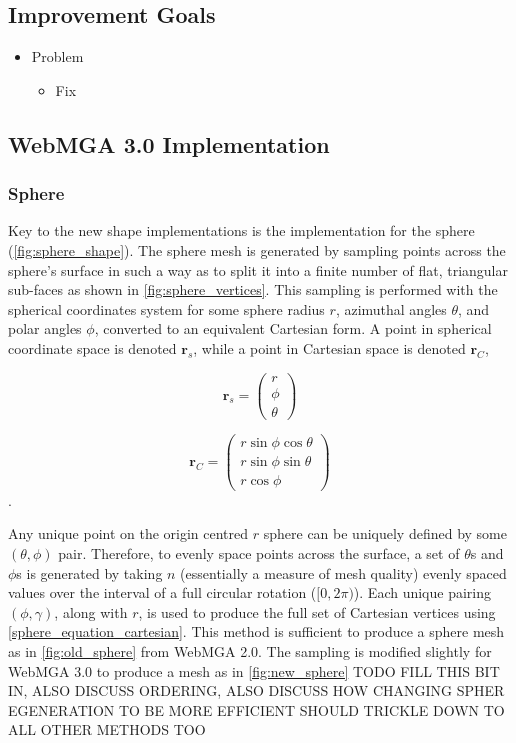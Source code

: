 \subsection{Improvement Goals}
\begin{itemize}
  \item Problem
    \begin{itemize}
      \item Fix
    \end{itemize}
\end{itemize}

\subsection{WebMGA 3.0 Implementation}
\subsubsection{Sphere}
Key to the new shape implementations is the implementation for the sphere (\cref{fig:sphere_shape}). The sphere mesh is generated by sampling points across the sphere's surface in such a way as to split it into a finite number of flat, triangular sub-faces as shown in \cref{fig:sphere_vertices}. This sampling is performed with the spherical coordinates system for some sphere radius $r$, azimuthal angles $\theta$, and polar angles $\phi$, converted to an equivalent Cartesian form. A point in spherical coordinate space is denoted $\mathbf{r}_{s}$, while a point in Cartesian space is denoted $\mathbf{r}_{C}$,

\begin{equation}
\mathbf{r}_{s}=\begin{pmatrix}r\\\phi\\\theta\end{pmatrix}
\label{sphere_equation_spherical}
\end{equation}

\begin{equation}
\mathbf{r}_{C}=\begin{pmatrix}r\sin\phi \cos\theta\\
r\sin\phi \sin\theta\\
r\cos\phi\end{pmatrix}
\label{sphere_equation_cartesian}
\end{equation}.

Any unique point on the origin centred $r$ sphere can be uniquely defined by some $(\theta,\phi)$ pair. Therefore, to evenly space points across the surface, a set of $\theta$s and $\phi$s is generated by taking $n$ (essentially a measure of mesh quality) evenly spaced values over the interval of a full circular rotation ($[0, 2\pi)$). Each unique pairing $(\phi,\gamma)$, along with $r$, is used to produce the full set of Cartesian vertices using \cref{sphere_equation_cartesian}. This method is sufficient to produce a sphere mesh as in \cref{fig:old_sphere} from WebMGA 2.0. The sampling is modified slightly for WebMGA 3.0 to produce a mesh as in \cref{fig:new_sphere} TODO FILL THIS BIT IN, ALSO DISCUSS ORDERING, ALSO DISCUSS HOW CHANGING SPHER EGENERATION TO BE MORE EFFICIENT SHOULD TRICKLE DOWN TO ALL OTHER METHODS TOO

